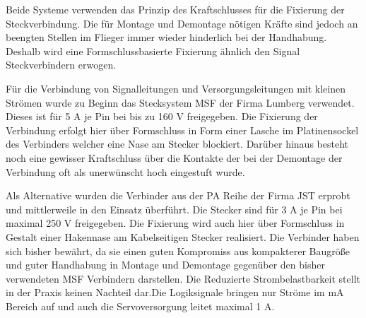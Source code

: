 Beide Systeme verwenden das Prinzip des Kraftschlusses für die Fixierung der Steckverbindung. Die für Montage und Demontage nötigen Kräfte sind jedoch an beengten Stellen im Flieger immer wieder hinderlich bei der Handhabung. Deshalb wird eine Formschlussbasierte Fixierung ähnlich den Signal Steckverbindern erwogen.

Für die Verbindung von Signalleitungen  und Versorgungsleitungen mit kleinen Strömen wurde zu Beginn das Stecksystem MSF der Firma Lumberg verwendet.
Dieses ist für 5 A je Pin bei bis zu 160 V freigegeben. Die Fixierung der Verbindung erfolgt hier über Formschluss in Form einer Lasche im Platinensockel des Verbinders welcher eine Nase am Stecker blockiert. Darüber hinaus besteht noch eine gewisser Kraftschluss über die Kontakte der bei der Demontage der Verbindung oft als unerwünscht hoch eingestuft wurde.

Als Alternative wurden die Verbinder aus der PA Reihe der Firma JST erprobt und mittlerweile in den Einsatz überführt.
Die Stecker sind für 3 A je Pin bei maximal 250 V freigegeben.
Die Fixierung wird auch hier über Formschluss in Gestalt einer Hakennase am Kabelseitigen Stecker realisiert.
Die Verbinder haben sich bisher bewährt, da sie einen guten Kompromiss aus kompakterer Baugröße und guter Handhabung in Montage und Demontage gegenüber den bisher verwendeten MSF Verbindern darstellen.
Die Reduzierte Strombelastbarkeit stellt in der Praxis keinen Nachteil dar.Die Logiksignale bringen nur Ströme im mA Bereich auf und auch die Servoversorgung leitet maximal 1 A.

